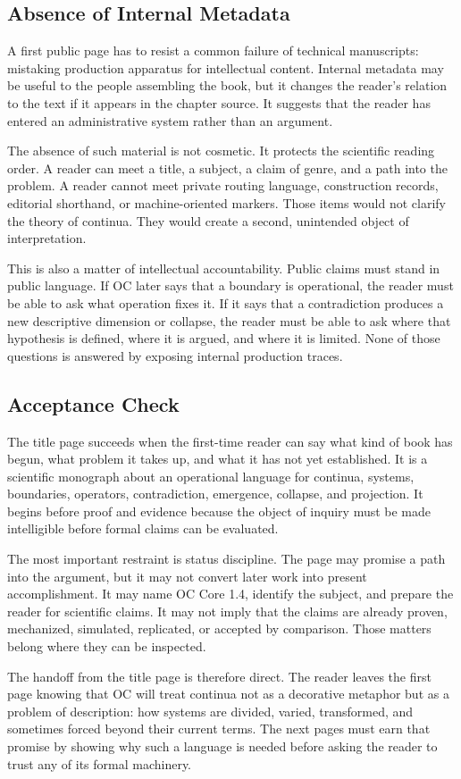 \documentclass[11pt,a4paper,openany]{book}
\begin{document}
\subsection{Absence of Internal Metadata}
A first public page has to resist a common failure of technical manuscripts: mistaking production apparatus for intellectual content. Internal metadata may be useful to the people assembling the book, but it changes the reader's relation to the text if it appears in the chapter source. It suggests that the reader has entered an administrative system rather than an argument. \cite{stauffer_percolation,grimmett_percolation}\par
The absence of such material is not cosmetic. It protects the scientific reading order. A reader can meet a title, a subject, a claim of genre, and a path into the problem. A reader cannot meet private routing language, construction records, editorial shorthand, or machine-oriented markers. Those items would not clarify the theory of continua. They would create a second, unintended object of interpretation.\par
This is also a matter of intellectual accountability. Public claims must stand in public language. If OC later says that a boundary is operational, the reader must be able to ask what operation fixes it. If it says that a contradiction produces a new descriptive dimension or collapse, the reader must be able to ask where that hypothesis is defined, where it is argued, and where it is limited. None of those questions is answered by exposing internal production traces.\par
\subsection{Acceptance Check}
The title page succeeds when the first-time reader can say what kind of book has begun, what problem it takes up, and what it has not yet established. It is a scientific monograph about an operational language for continua, systems, boundaries, operators, contradiction, emergence, collapse, and projection. It begins before proof and evidence because the object of inquiry must be made intelligible before formal claims can be evaluated. \cite{stauffer_percolation,grimmett_percolation}\par
The most important restraint is status discipline. The page may promise a path into the argument, but it may not convert later work into present accomplishment. It may name OC Core 1.4, identify the subject, and prepare the reader for scientific claims. It may not imply that the claims are already proven, mechanized, simulated, replicated, or accepted by comparison. Those matters belong where they can be inspected.\par
The handoff from the title page is therefore direct. The reader leaves the first page knowing that OC will treat continua not as a decorative metaphor but as a problem of description: how systems are divided, varied, transformed, and sometimes forced beyond their current terms. The next pages must earn that promise by showing why such a language is needed before asking the reader to trust any of its formal machinery.\par
\end{document}
